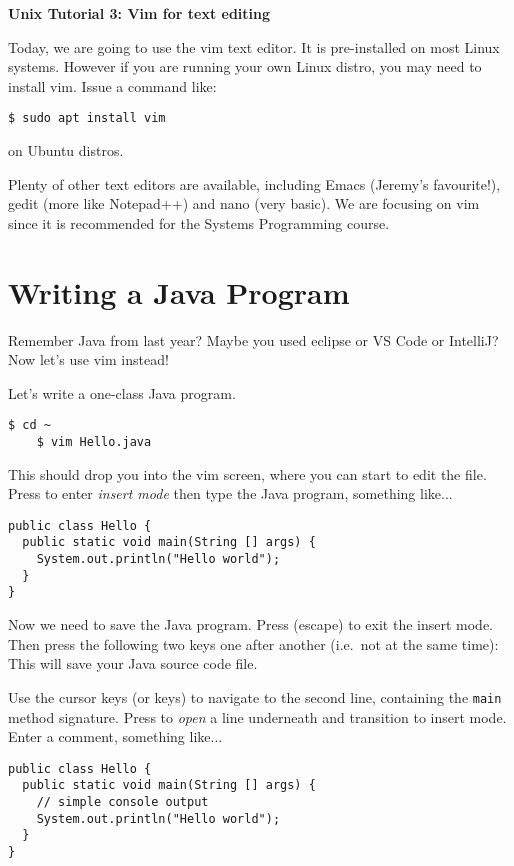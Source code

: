 \documentclass{article}
\begin{document}
\noindent
{\Large \textsf{\textbf{Unix Tutorial 3: Vim for text editing}}}

\bigskip


Today, we are going to use the vim text editor. It is pre-installed on most Linux systems. However if you are running your own Linux distro, you may need to install vim. Issue a command like:
\begin{lstlisting}[style=BashInputStyle]
    $ sudo apt install vim
\end{lstlisting}
on Ubuntu distros.

Plenty of other text editors are available, including Emacs (Jeremy's favourite!), gedit (more like Notepad++) and nano (very basic). We are focusing on vim since it is recommended for the Systems Programming course.

\section*{Writing a Java Program}

Remember Java from last year? Maybe you used eclipse or VS Code or IntelliJ? Now let's use vim instead!

Let's write a one-class Java program. 

\begin{lstlisting}[style=BashInputStyle]
    $ cd ~
    $ vim Hello.java
\end{lstlisting}

This should drop you into the vim screen, where you can start to edit the file. Press  to enter \textit{insert mode} then type the Java program, something like...

\begin{lstlisting}[style=JavaProg]
public class Hello {
  public static void main(String [] args) {
    System.out.println("Hello world");
  }
}
\end{lstlisting}

Now we need to save the Java program. Press \keys{\esc} (escape) to exit the insert mode. Then press the following two keys one after another (i.e.\ not at the same time): \keys{:}  \keys{\enter}
This will save your Java source code file.

Use the cursor keys (or     keys) to navigate to the second line, containing the \texttt{main} method signature. Press  to \textit{open} a line underneath and transition to insert mode. Enter a comment, something like...
\begin{lstlisting}[style=JavaProg]
public class Hello {
  public static void main(String [] args) {
    // simple console output
    System.out.println("Hello world");
  }
}
\end{lstlisting}
\end{document}
